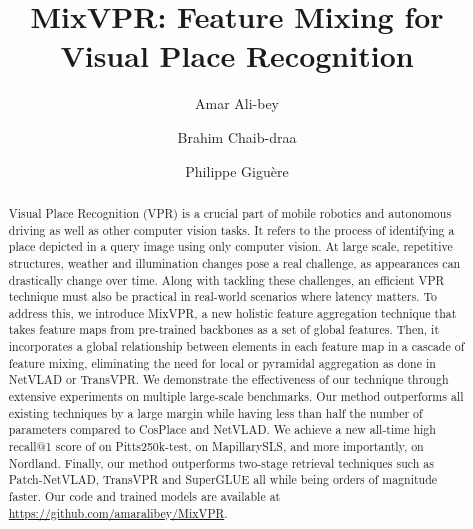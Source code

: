 \documentclass[10pt,twocolumn,letterpaper]{article}
\begin{document}
\title{MixVPR: Feature Mixing for Visual Place Recognition}

\author[]{Amar Ali-bey}
\author[]{Brahim Chaib-draa}
\author[]{Philippe Gigu\`ere}




\maketitle
\thispagestyle{empty}

\begin{abstract}
Visual Place Recognition (VPR) is a crucial part of mobile robotics and autonomous driving as well as other computer vision tasks. It refers to the process of identifying a place depicted in a query image using only computer vision. At large scale, repetitive structures, weather and illumination changes pose a real challenge, as appearances can drastically change over time. Along with tackling these challenges, an efficient VPR technique must also be practical in real-world scenarios where latency matters.
To address this, we introduce MixVPR, a new holistic feature aggregation technique that takes feature maps from pre-trained backbones as a set of global features. Then, it incorporates a global relationship between elements in each feature map in a cascade of feature mixing, eliminating the need for local or pyramidal aggregation as done in NetVLAD or TransVPR. We demonstrate the effectiveness of our technique through extensive experiments on multiple large-scale benchmarks. Our method outperforms all existing techniques by a large margin while having less than half the number of parameters compared to CosPlace and NetVLAD. We achieve a new all-time high recall@1 score of  on \mbox{Pitts250k-test},  on MapillarySLS, and more importantly,  on Nordland. 
Finally, our method outperforms two-stage retrieval techniques such as \mbox{Patch-NetVLAD}, TransVPR and SuperGLUE all while being orders of magnitude faster. Our code and trained models are available at \mbox{\url{https://github.com/amaralibey/MixVPR}.}

\end{abstract}
\end{document}
